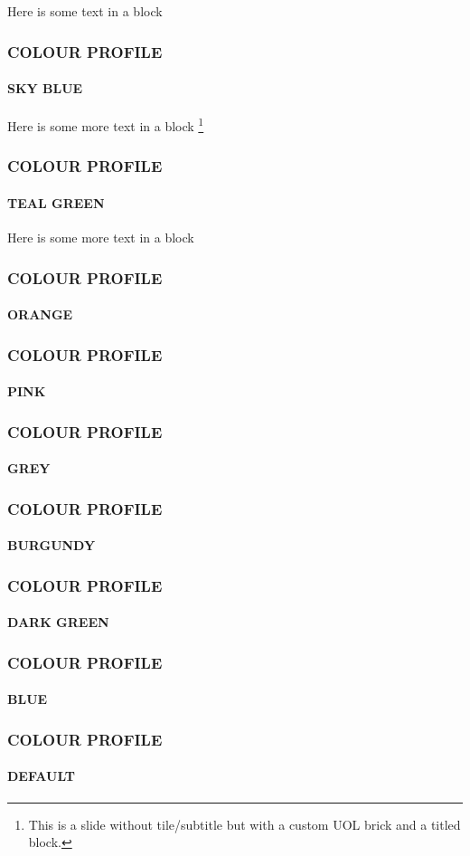 \documentclass[
aspectratio=169,
]{beamer}
\begin{document}
\begin{frame}[uolcolours=Sky Blue]
    \begin{block}{Here is some text in a block}
      \lipsum[1][1-5]
    \end{block}
\end{frame}
\begin{frame}[uolcolours=Sky Blue]
    \frametitle{COLOUR PROFILE}
    \framesubtitle{SKY BLUE}
    \democontent
\end{frame}

\begin{frame}[uolcolours=Teal Green]
    \begin{block}{Here is some more text in a block}
        \lipsum[1][1-5]\footnote{This is a slide without tile/subtitle but with a custom UOL brick and a titled block.}
    \end{block}
\end{frame}
\begin{frame}[uolcolours=Teal Green]
    \frametitle{COLOUR PROFILE}
    \framesubtitle{TEAL GREEN}
    \democontent
\end{frame}

\begin{frame}
    \begin{block}{Here is some more text in a block}
        \lipsum[1][2-7]
    \end{block}
\end{frame}

\begin{frame}
    \frametitle{COLOUR PROFILE}
    \framesubtitle{ORANGE}
    \democontent
\end{frame}


\begin{frame}[uolcolours=Pink]
    \frametitle{COLOUR PROFILE}
    \framesubtitle{PINK}
    \democontent
\end{frame}

\begin{frame}[uolcolours=Grey]
    \frametitle{COLOUR PROFILE}
    \framesubtitle{GREY}
    \democontent
\end{frame}

\begin{frame}[uolcolours=Burgundy]
    \frametitle{COLOUR PROFILE}
    \framesubtitle{BURGUNDY}
    \democontent
\end{frame}

\begin{frame}[uolcolours=Dark Green]
    \frametitle{COLOUR PROFILE}
    \framesubtitle{DARK GREEN}
    \democontent
\end{frame}

\begin{frame}[uolcolours=Blue]
    \frametitle{COLOUR PROFILE}
    \framesubtitle{BLUE}
    \democontent
\end{frame}

\begin{frame}
    \frametitle{COLOUR PROFILE}
    \framesubtitle{DEFAULT}
    \democontent
\end{frame}
\end{document}
